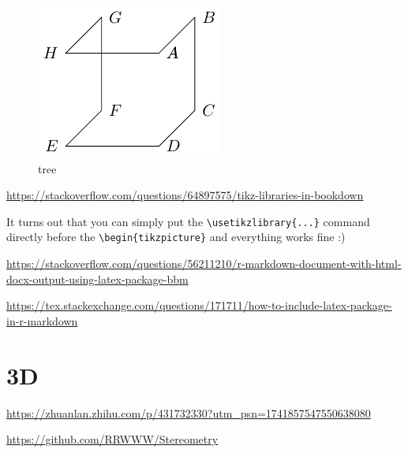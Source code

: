 \documentclass[
]{book}
\theoremstyle{definition}
\theoremstyle{definition}
\theoremstyle{definition}
\theoremstyle{definition}
\theoremstyle{remark}
\begin{document}
\begin{figure}
\includegraphics[width=0.75\linewidth]{202401311000-TikZ_files/figure-latex/unnamed-chunk-61-1} \caption{tree}\label{fig:unnamed-chunk-61}
\end{figure}

\url{https://stackoverflow.com/questions/64897575/tikz-libraries-in-bookdown}

It turns out that you can simply put the \texttt{\textbackslash{}usetikzlibrary\{...\}} command directly before the \texttt{\textbackslash{}begin\{tikzpicture\}} and everything works fine :)

\url{https://stackoverflow.com/questions/56211210/r-markdown-document-with-html-docx-output-using-latex-package-bbm}

\url{https://tex.stackexchange.com/questions/171711/how-to-include-latex-package-in-r-markdown}

\hypertarget{d-1}{%
\section{3D}\label{d-1}}

\url{https://zhuanlan.zhihu.com/p/431732330?utm_psn=1741857547550638080}

\url{https://github.com/RRWWW/Stereometry}
\end{document}
